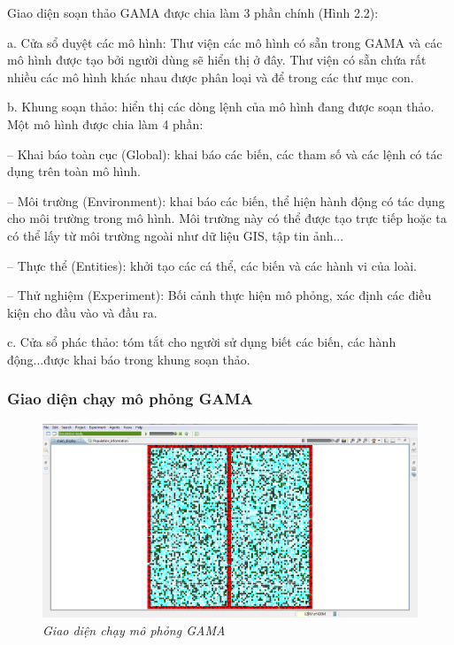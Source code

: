 \documentclass[13pt]{extreport}
\begin{document}
Giao diện soạn thảo GAMA được chia làm 3 phần  chính (Hình 2.2):

a.  Cửa  sổ duyệt  các mô hình:  Thư  viện  các mô hình  có sẵn  trong GAMA và các mô hình được tạo bởi người dùng sẽ hiển thị ở đây. Thư viện có sẵn chứa rất  nhiều các mô hình khác nhau  được phân loại và để trong  các thư  mục con.

b.  Khung  soạn thảo:  hiển thị  các dòng lệnh của mô hình  đang  được soạn thảo.  Một mô hình được chia làm 4 phần: 

–  Khai  báo toàn  cục (Global):  khai  báo các biến,  các tham  số và các lệnh có tác  dụng trên  toàn  mô hình.

–  Môi trường  (Environment): khai báo các biến, thể  hiện hành động có tác dụng cho môi trường  trong  mô hình.  Môi trường này có thể được tạo trực tiếp hoặc ta có thể lấy từ môi trường ngoài như dữ liệu GIS, tập  tin  ảnh...

–  Thực thể (Entities): khởi tạo các cá thể, các biến và các hành vi của loài.

–  Thử nghiệm (Experiment): Bối cảnh thực hiện mô phỏng, xác định các điều kiện cho đầu  vào và đầu  ra.

c.  Cửa  sổ phác  thảo:  tóm  tắt cho người sử dụng  biết  các biến,  các hành  động...được  khai báo trong  khung  soạn thảo.

\subsubsection*{Giao diện chạy mô phỏng GAMA}
\begin{figure}
\begin{center}
\includegraphics[scale=0.4]{gama}
\end{center}
\caption{\textit{ Giao diện chạy mô phỏng GAMA}}
\end{figure}
\end{document}
